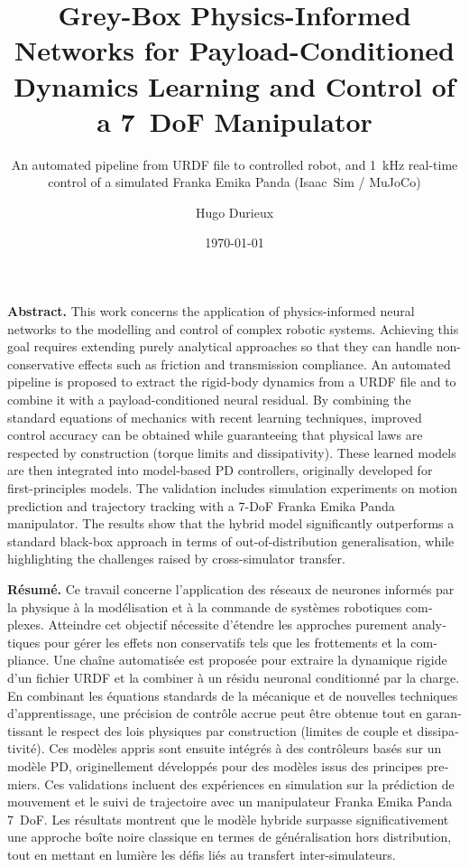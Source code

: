 \documentclass[a4paper, oneside]{article}
\author{Hugo Durieux}
\date{\today}
\title{Grey-Box Physics-Informed Networks for Payload-Conditioned Dynamics
Learning and Control of a 7~DoF Manipulator}
\subtitle{An automated pipeline from URDF file to controlled robot, and
\SI{1}{\kilo\hertz} real-time control of a simulated Franka Emika Panda
(Isaac~Sim / MuJoCo)}
\begin{document}
\maketitle

\begin{center}
\begin{minipage}{0.88\textwidth}
\small
\textbf{Abstract.} This work concerns the application of physics-informed neural networks to the modelling and control of complex robotic systems. Achieving this goal requires extending purely analytical approaches so that they can handle non-conservative effects such as friction and transmission compliance. An automated pipeline is proposed to extract the rigid-body dynamics from a URDF file and to combine it with a payload-conditioned neural residual. By combining the standard equations of mechanics with recent learning techniques, improved control accuracy can be obtained while guaranteeing that physical laws are respected by construction (torque limits and dissipativity). These learned models are then integrated into model-based PD controllers, originally developed for first-principles models. The validation includes simulation experiments on motion prediction and trajectory tracking with a 7-DoF Franka Emika Panda manipulator. The results show that the hybrid model significantly outperforms a standard black-box approach in terms of out-of-distribution generalisation, while highlighting the challenges raised by cross-simulator transfer.

\medskip
\begin{otherlanguage}{french}
\textbf{Résumé.} Ce travail concerne l'application des réseaux de neurones informés par la physique à la modélisation et à la commande de systèmes robotiques complexes. Atteindre cet objectif nécessite d'étendre les approches purement analytiques pour gérer les effets non conservatifs tels que les frottements et la compliance. Une chaîne automatisée est proposée pour extraire la dynamique rigide d'un fichier URDF et la combiner à un résidu neuronal conditionné par la charge. En combinant les équations standards de la mécanique et de nouvelles techniques d'apprentissage, une précision de contrôle accrue peut être obtenue tout en garantissant le respect des lois physiques par construction (limites de couple et dissipativité). Ces modèles appris sont ensuite intégrés à des contrôleurs basés sur un modèle PD, originellement développés pour des modèles issus des principes premiers. Ces validations incluent des expériences en simulation sur la prédiction de mouvement et le suivi de trajectoire avec un manipulateur Franka Emika Panda 7~DoF. Les résultats montrent que le modèle hybride surpasse significativement une approche boîte noire classique en termes de généralisation hors distribution, tout en mettant en lumière les défis liés au transfert inter-simulateurs.
\end{otherlanguage}
\end{minipage}
\end{center}
\end{document}
